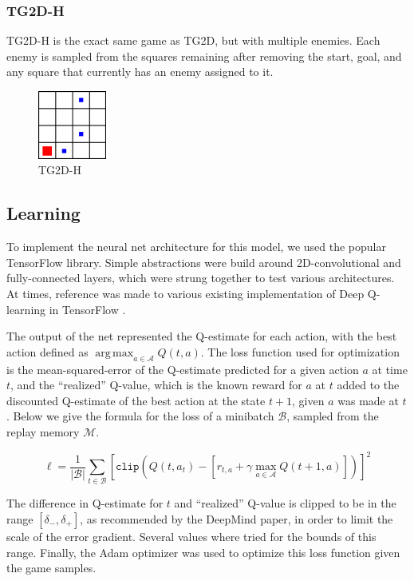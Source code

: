 \documentclass[9pt,journal]{IEEEtran}
\DeclareMathOperator*{\argmax}{arg\,max}
\begin{document}
\subsubsection{TG2D-H}

TG2D-H is the exact same game as TG2D, but with multiple enemies. Each enemy is sampled from the squares remaining after removing the start, goal, and any square that currently has an enemy assigned to it.

\begin{figure}[ht]
  \includegraphics[width=0.2\textwidth]{report/TG2D-H.png}
  \centering
  \caption{TG2D-H}
  \label{fig:tg2dh}
\end{figure}

\subsection{Learning}

To implement the neural net architecture for this model, we used the popular TensorFlow library. Simple abstractions were build around 2D-convolutional and fully-connected layers, which were strung together to test various architectures. At times, reference was made to various existing implementation of Deep Q-learning in TensorFlow \cite{deep-rl-tensorflow} \cite{dqn-tensorflow}.

The output of the net represented the Q-estimate for each action, with the best action defined as $\argmax_{a \in \mathcal{A}} Q(t, a)$. The loss function used for optimization is the mean-squared-error of the Q-estimate predicted for a given action $a$ at time $t$, and the ``realized'' Q-value, which is the known reward for $a$ at $t$ added to the discounted Q-estimate of the best action at the state $t+1$, given $a$ was made at $t$. Below we give the formula for the loss of a minibatch $\mathcal{B}$, sampled from the replay memory $\mathcal{M}$.

\[\ell = \frac{1}{|\mathcal{B}|} \sum_{t \in \mathcal{B}} \left[\texttt{clip}\left(Q\left(t, a_t\right) - \left[r_{t,a}  + \gamma \max_{a \in \mathcal{A}} Q\left(t+1, a\right)\right]\right)\right]^2\]

The difference in Q-estimate for $t$ and ``realized'' Q-value is clipped to be in the range $[\delta_{-}, \delta_{+}]$, as recommended by the DeepMind paper, in order to limit the scale of the error gradient. Several values where tried for the bounds of this range. Finally, the Adam optimizer was used to optimize this loss function given the game samples.
\end{document}
